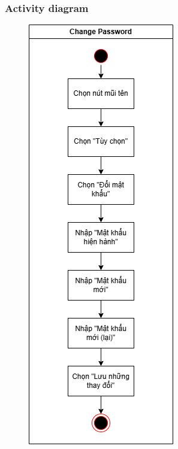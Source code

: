 \documentclass[a4paper, 12pt]{article}
\begin{document}
\subsubsection{Activity diagram}
\begin{figure}[H]
    \centering
    \includegraphics[height=0.5\textheight]{images/cp-action.drawio.png}
    \label{fig:enter-label}
\end{figure}
\end{document}
